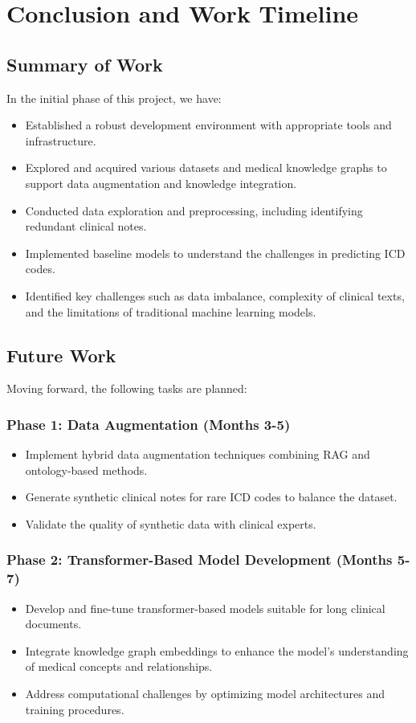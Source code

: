 \chapter{Conclusion and Work Timeline}

\section{Summary of Work}
In the initial phase of this project, we have:
\begin{itemize}
    \item Established a robust development environment with appropriate tools and infrastructure.
    \item Explored and acquired various datasets and medical knowledge graphs to support data augmentation and knowledge integration.
    \item Conducted data exploration and preprocessing, including identifying redundant clinical notes.
    \item Implemented baseline models to understand the challenges in predicting ICD codes.
    \item Identified key challenges such as data imbalance, complexity of clinical texts, and the limitations of traditional machine learning models.
\end{itemize}

\section{Future Work}
Moving forward, the following tasks are planned:

\subsection{Phase 1: Data Augmentation (Months 3-5)}
\begin{itemize}
    \item Implement hybrid data augmentation techniques combining RAG and ontology-based methods.
    \item Generate synthetic clinical notes for rare ICD codes to balance the dataset.
    \item Validate the quality of synthetic data with clinical experts.
\end{itemize}

\subsection{Phase 2: Transformer-Based Model Development (Months 5-7)}
\begin{itemize}
    \item Develop and fine-tune transformer-based models suitable for long clinical documents.
    \item Integrate knowledge graph embeddings to enhance the model's understanding of medical concepts and relationships.
    \item Address computational challenges by optimizing model architectures and training procedures.
\end{itemize}

